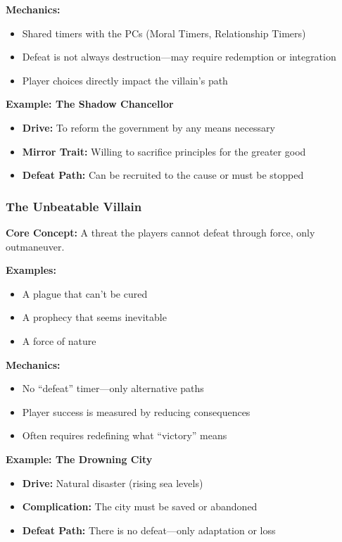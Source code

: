 \documentclass[10pt]{article}
\begin{document}
\textbf{Mechanics:}
\begin{itemize}
  \item Shared timers with the PCs (Moral Timers, Relationship Timers)
  \item Defeat is not always destruction---may require redemption or integration
  \item Player choices directly impact the villain's path
\end{itemize}

\textbf{Example: The Shadow Chancellor}
\begin{itemize}
  \item \textbf{Drive:} To reform the government by any means necessary
  \item \textbf{Mirror Trait:} Willing to sacrifice principles for the greater good
  \item \textbf{Defeat Path:} Can be recruited to the cause or must be stopped
\end{itemize}

\subsubsection{The Unbeatable Villain}

\textbf{Core Concept:} A threat the players cannot defeat through force, only outmaneuver.

\textbf{Examples:}
\begin{itemize}
  \item A plague that can't be cured
  \item A prophecy that seems inevitable
  \item A force of nature
\end{itemize}

\textbf{Mechanics:}
\begin{itemize}
  \item No ``defeat'' timer---only alternative paths
  \item Player success is measured by reducing consequences
  \item Often requires redefining what ``victory'' means
\end{itemize}

\textbf{Example: The Drowning City}
\begin{itemize}
  \item \textbf{Drive:} Natural disaster (rising sea levels)
  \item \textbf{Complication:} The city must be saved or abandoned
  \item \textbf{Defeat Path:} There is no defeat---only adaptation or loss
\end{itemize}
\end{document}
